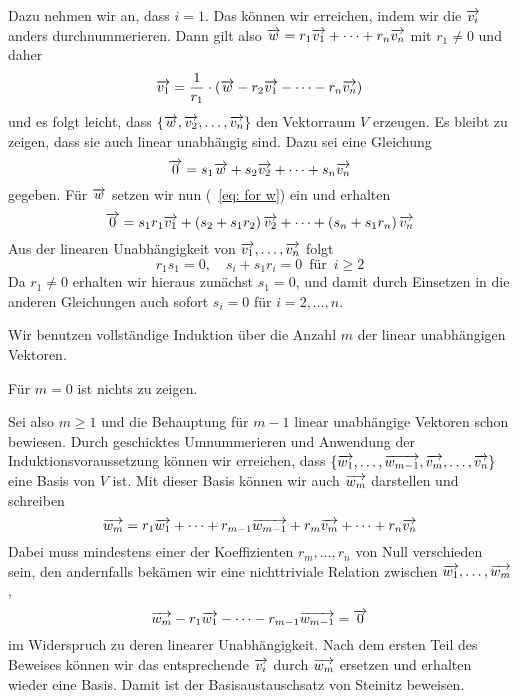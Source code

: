 Dazu nehmen wir an, dass $i = 1$. Das können wir erreichen, indem wir die $\overrightarrow{v_i}$ anders 
durchnummerieren. Dann gilt also 
$ \overrightarrow{w} = r_1 \overrightarrow{v_1} + \cdots + r_n \overrightarrow{v_n} $
mit $r_1 \neq 0$ und daher 
   	$$ \overrightarrow{v_1} = \frac {1}{r_1} \cdot \left( \overrightarrow{w} - r_2 \overrightarrow{v_1} - \cdots - 
  	r_n \overrightarrow{v_n} \right) $$   
und es folgt leicht, dass $\{ \overrightarrow{w}, \overrightarrow{v_2}, \ldots, \overrightarrow{v_n} \}$ den 
Vektorraum $V$ erzeugen. Es bleibt zu zeigen, dass sie auch linear unabhängig sind. Dazu sei eine Gleichung
  	$$ \overrightarrow{0} = s_1\overrightarrow{w} + s_2 \overrightarrow{v_2} + \cdots + s_n \overrightarrow{v_n} $$
gegeben. Für $\overrightarrow{w}$ setzen wir nun (~\ref{eq: for w}) ein und erhalten
  	$$ \overrightarrow{0} = s_1 r_1 \overrightarrow{v_1} + 
   	\left(s_2 + s_1 r_2 \right) \overrightarrow{v_2} + \cdots + 
   	\left(s_n + s_1 r_n \right) \overrightarrow{v_n} $$
Aus der linearen Unabhängigkeit von $\overrightarrow{v_1}, \ldots , \overrightarrow{v_n}$ folgt
  	$$ r_1 s_1 = 0, \quad s_i + s_1 r_i = 0 \, \textrm{ für } \, i \geq 2 $$
Da $r_1 \neq 0$ erhalten wir hieraus zunächst $s_1 = 0$, und damit durch Einsetzen in die anderen Gleichungen 
auch sofort $s_i = 0$ für $i = 2, \ldots, n$. 

Wir benutzen vollständige Induktion über die Anzahl $m$ der linear 
unabhängigen Vektoren.

Für $m = 0$ ist nichts zu zeigen.

Sei also $m \geq 1$ und die Behauptung für $m-1$ linear unabhängige Vektoren schon bewiesen. Durch geschicktes 
Umnummerieren und Anwendung der Induktionsvoraussetzung können wir erreichen, dass $\{ \overrightarrow{w_1}, 
\ldots , \overrightarrow{w_{m-1}}, \overrightarrow{v_m}, \ldots, \overrightarrow{v_n} \}$ eine Basis von $V$ ist. 
Mit dieser Basis können wir auch $\overrightarrow{w_m}$ darstellen und schreiben
  	$$\overrightarrow{w_m} = r_1 \overrightarrow{w_1} + \cdots + r_{m-1} \overrightarrow{w_{m-1}} + 
  	r_m \overrightarrow{v_m} + \cdots + r_n \overrightarrow{v_n} $$
Dabei muss mindestens einer der Koeffizienten $r_m, \ldots, r_n$ von Null verschieden sein, den andernfalls 
bekämen wir eine nichttriviale Relation zwischen $\overrightarrow{w_1}, \ldots,  \overrightarrow{w_m}$, 
  	$$ \overrightarrow{w_m} - r_1 \overrightarrow{w_1} - \cdots - r_{m-1} \overrightarrow{w_{m-1}} = 
   	\overrightarrow{0} $$
im Widerspruch zu deren linearer Unabhängigkeit. Nach dem ersten Teil des Beweises können wir das 
entsprechende $\overrightarrow{v_i}$ durch $\overrightarrow{w_m}$ ersetzen und erhalten wieder eine Basis. 
Damit ist der Basisaustauschsatz von Steinitz beweisen.

